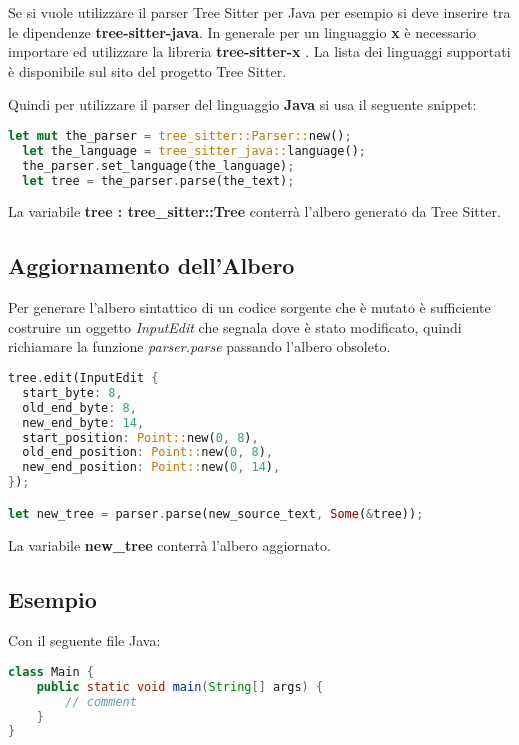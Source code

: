 Se si vuole utilizzare il parser Tree Sitter per Java per esempio si deve inserire tra le dipendenze \textbf{tree-sitter-java}.
In generale per un linguaggio \textbf{x} \`e necessario importare ed utilizzare la libreria \textbf{tree-sitter-x} \cite{TreeSitterRustGrammars}.
La lista dei linguaggi supportati \`e disponibile sul sito del progetto Tree Sitter.

Quindi per utilizzare il parser del linguaggio \textbf{Java} si usa il seguente snippet:

\begin{lstlisting}[language=Rust]
  let mut the_parser = tree_sitter::Parser::new();
  let the_language = tree_sitter_java::language();
  the_parser.set_language(the_language);
  let tree = the_parser.parse(the_text);
\end{lstlisting}

La variabile \textbf{tree : tree\_sitter::Tree} conterr\`a l'albero generato da Tree Sitter.

\subsection{Aggiornamento dell'Albero}

Per generare l'albero sintattico di un codice sorgente che \`e mutato \`e sufficiente costruire un oggetto \emph{InputEdit} che segnala dove \`e stato modificato, quindi richiamare la funzione \emph{parser.parse} passando l'albero obsoleto.

\begin{lstlisting}[language=Rust]
tree.edit(InputEdit {
  start_byte: 8,
  old_end_byte: 8,
  new_end_byte: 14,
  start_position: Point::new(0, 8),
  old_end_position: Point::new(0, 8),
  new_end_position: Point::new(0, 14),
});

let new_tree = parser.parse(new_source_text, Some(&tree));
\end{lstlisting}

La variabile \textbf{new\_tree} conterr\`a l'albero aggiornato.

\subsection{Esempio}

Con il seguente file Java:

\begin{lstlisting}[language=Java]
class Main {
	public static void main(String[] args) {
    	// comment
    }
}
\end{lstlisting}

